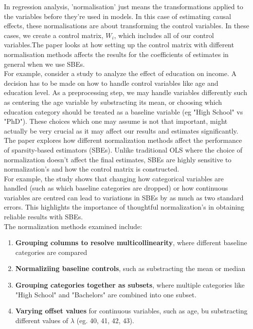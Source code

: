 In regression analysis, 'normalisation' just means the transformations applied to the variables before they're used in models. In this case of estimating causal effects, these normalisations are about transforming the control variables. In these cases, we create a control matrix, $W_i$, which includes all of our control variables.The paper looks at how setting up the control matrix with different normalisation methods affects the results for the coefficients of estimates in general when we use SBEs. \\

For example, consider a study to analyze the effect of education on income. A decision has to be made on how to handle control variables like age and education level. As a preprocessing step, we may handle variables differently such as centering the age variable by substracting its mean, or choosing which education category should be treated as a baseline variable (eg "High School" vs "PhD"). These choices which one may assume is not that important, might actually be very crucial as it may affect our results and estimates significantly. \\

The paper explores how different normalization methods affect the performance of sparsity-based estimators (SBEs). Unlike traditional OLS where the choice of normalization doesn't affect the final estimates, SBEs are highly sensitive to normalization's and how the control matrix is constructed. \\

For example, the study shows that changing how categorical variables are handled (such as which baseline categories are dropped) or how continuous variables are centred can lead to variations in SBEs by as much as two standard errors. This highlights the importance of thoughtful normalization's in obtaining reliable results with SBEs.\\

The normalization methods examined include:
\begin{enumerate}
    \item \textbf{Grouping columns to resolve multicollinearity}, where different baseline categories are compared
    \item \textbf{Normaliziing baseline controls}, such as substracting the mean or median 
    \item \textbf{Grouping categories together as subsets}, where multiple categories like "High School" and "Bachelors" are combined into one subset. 
    \item \textbf{Varying offset values} for continuous variables, such as age, bu substracting different values of $\lambda$ (eg. 40, 41, 42, 43).
    
\end{enumerate}

